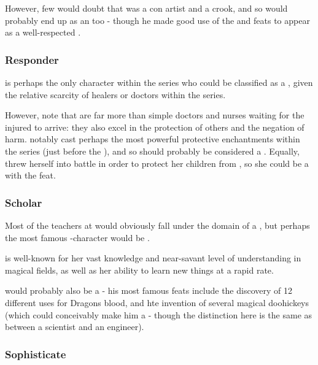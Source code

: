 However, few would doubt that  was a con artist and a crook, and so would probably end up as an  too - though he made good use of the  and  feats to appear as a well-respected .

\subsubsection{Responder}

 is perhaps the only character within the series who could be classified as a , given the relative scarcity of healers or doctors within the series. 

However, note that  are far more than simple doctors and nurses waiting for the injured to arrive: they also excel in the protection of others and the negation of harm.  notably cast perhaps the most powerful protective enchantments within the series (just before the ), and so should probably be considered a . Equally,  threw herself into battle in order to protect her children from , so she could be a  with the  feat.

\subsubsection{Scholar}

Most of the teachers at  would obviously fall under the domain of a , but perhaps the most famous -character would be . 

 is well-known for her vast knowledge and near-savant level of understanding in magical fields, as well as her ability to learn new things at a rapid rate. 

 would probably also be a  - his most famous feats include the discovery of 12 different uses for Dragons blood, and hte invention of several magical doohickeys (which could conceivably make him a  - though the distinction here is the same as between a scientist and an engineer). 


\subsubsection{Sophisticate}

